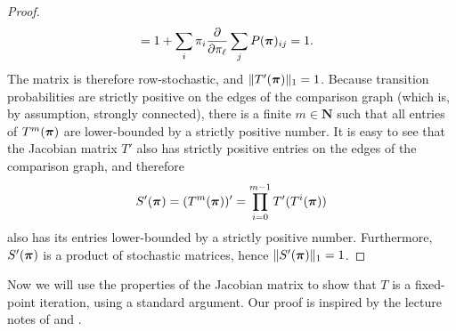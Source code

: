 \begin{proof}
\begin{align}
&= 1 + \sum_i \pi_i \frac{\partial}{\partial \pi_\ell} \sum_j P(\bm{\pi})_{ij} = 1.
\end{align}
The matrix is therefore row-stochastic, and $\Vert T'(\bm{\pi}) \Vert_1 = 1$.
Because transition probabilities are strictly positive on the edges of the comparison graph (which is, by assumption, strongly connected), there is a finite $m \in \mathbf{N}$ such that all entries of $T^m(\bm{\pi})$ are lower-bounded by a strictly positive number.
It is easy to see that the Jacobian matrix $T'$ also has strictly positive entries on the edges of the comparison graph, and therefore
\begin{align}
S'(\bm{\pi}) = (T^m(\bm{\pi}))' = \prod_{i = 0}^{m-1} T'(T^i(\bm{\pi}))
\end{align}
also has its entries lower-bounded by a strictly positive number.
Furthermore, $S'(\bm{\pi})$ is a product of stochastic matrices, hence $\Vert S'(\bm{\pi}) \Vert_1 = 1$.
\end{proof}

Now we will use the properties of the Jacobian matrix to show that $T$ is a fixed-point iteration, using a standard argument.
Our proof is inspired by the lecture notes of \citet{tresch2007convergence} and \citet{petersdorff2014fixed}.

